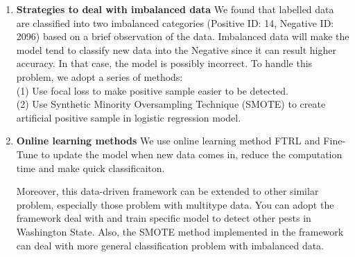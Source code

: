 \documentclass[12pt]{article}
\begin{document}
	\begin{enumerate}[\bf 1.]
		\item \textbf{Strategies to deal with imbalanced data}
		We found that labelled data are classified into two imbalanced categories (Positive ID: 14, Negative ID: 2096) based on a brief observation of the data. Imbalanced data will make the model tend to classify new data into the Negative since it can result higher accuracy. In that case, the model is possibly incorrect. To handle this problem, we adopt a series of methods:\\
		(1) Use focal loss to make positive sample easier to be detected.\\
		(2) Use Synthetic Minority Oversampling Technique (SMOTE) to create artificial positive sample in logistic regression model.
		\item \textbf{Online learning methods}
		We use online learning method FTRL and Fine-Tune to update the model when new data comes in, reduce the computation time and make quick classificaiton.
		
		
		Moreover, this data-driven framework can be extended to other similar problem, especially those problem with multitype data. You can adopt the framework deal with and train specific model to detect other pests in Washington State. Also, the SMOTE method implemented in the framework can deal with more general classification problem with imbalanced data.
	\end{enumerate}
		
\end{document}
